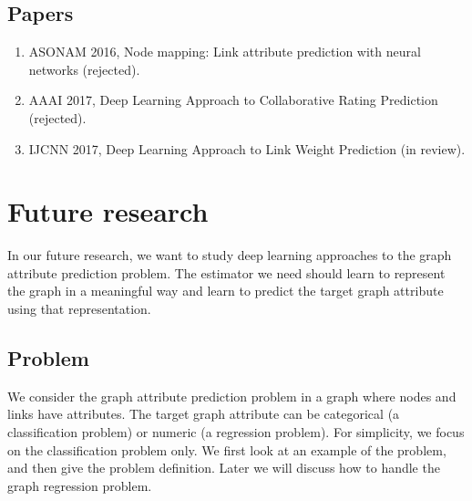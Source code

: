 \documentclass{article}
\begin{document}
\subsection{Papers}
\begin{enumerate}
	\item ASONAM 2016, Node mapping: Link attribute prediction with neural networks (rejected).
	\item AAAI 2017, Deep Learning Approach to Collaborative Rating Prediction (rejected).
	\item IJCNN 2017, Deep Learning Approach to Link Weight Prediction (in review).
\end{enumerate}

\section{Future research}
In our future research,
we want to study deep learning approaches to the graph attribute prediction problem.
The estimator we need should learn to represent the graph in a meaningful way
and learn to predict the target graph attribute using that representation.

\subsection{Problem}
We consider the graph attribute prediction problem
in a graph where nodes and links have attributes.
The target graph attribute can be
categorical (a classification problem) or numeric (a regression problem).
For simplicity, we focus on the classification problem only.
We first look at an example of the problem,
and then give the problem definition.
Later we will discuss how to handle the graph regression problem.
\end{document}
